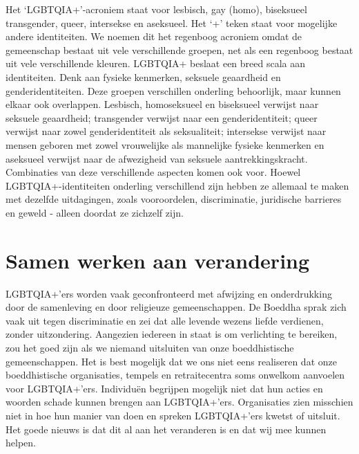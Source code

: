 \documentclass[12pt,openany]{book}
\begin{document}
Het ‘LGBTQIA+’-acroniem staat voor lesbisch, gay (homo), biseksueel transgender, queer, intersekse en aseksueel. Het ‘+’ teken staat voor mogelijke andere identiteiten. We noemen dit het regenboog acroniem omdat de gemeenschap bestaat uit vele verschillende groepen, net als een regenboog bestaat uit vele verschillende kleuren. 
LGBTQIA+ beslaat een breed scala aan identiteiten. Denk aan fysieke kenmerken, seksuele geaardheid en genderidentiteiten. Deze groepen verschillen onderling behoorlijk, maar kunnen elkaar ook overlappen. Lesbisch, homoseksueel en biseksueel verwijst naar seksuele geaardheid; transgender verwijst naar een genderidentiteit; queer verwijst naar zowel genderidentiteit als seksualiteit; intersekse verwijst naar mensen geboren met zowel vrouwelijke als mannelijke fysieke kenmerken en aseksueel verwijst naar de afwezigheid van seksuele aantrekkingskracht. Combinaties van deze verschillende aspecten komen ook voor. 
Hoewel LGBTQIA+-identiteiten onderling verschillend zijn hebben ze allemaal te maken met dezelfde uitdagingen, zoals vooroordelen, discriminatie, juridische barrieres en geweld - alleen doordat ze zichzelf zijn.

\section*{Samen werken aan verandering}

LGBTQIA+’ers worden vaak geconfronteerd met afwijzing en onderdrukking door de samenleving en door religieuze gemeenschappen. De Boeddha  sprak zich vaak uit tegen discriminatie en zei dat alle levende wezens liefde verdienen, zonder uitzondering. Aangezien iedereen in staat is om verlichting te bereiken, zou het goed zijn als we niemand uitsluiten van onze boeddhistische gemeenschappen.  
Het is best mogelijk dat we ons niet eens realiseren dat onze boeddhistische organisaties, tempels en retraitecentra soms onwelkom aanvoelen voor LGBTQIA+’ers. Individuën begrijpen mogelijk niet dat hun acties en woorden schade kunnen brengen aan LGBTQIA+’ers. Organisaties zien misschien niet in hoe hun manier van doen en spreken LGBTQIA+’ers kwetst of uitsluit.  
Het goede nieuws is dat dit al aan het veranderen is en dat wij mee kunnen helpen.

\end{document}
